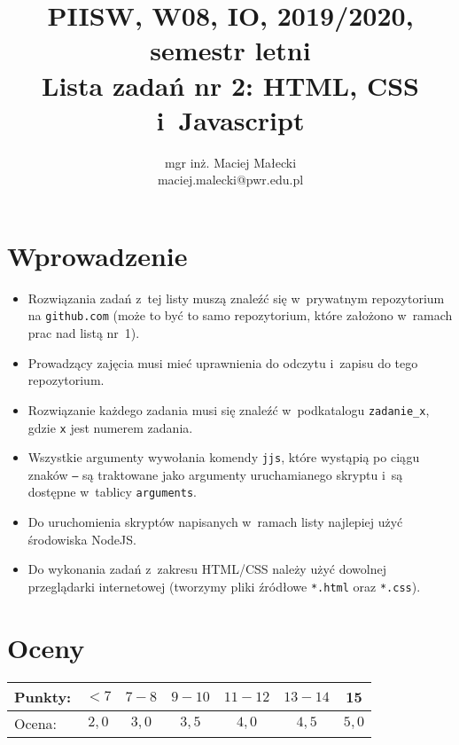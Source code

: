 \documentclass[12pt]{article}
\title{PIISW, W08, IO, 2019/2020, semestr letni\\Lista zadań nr 2: HTML, CSS i~Javascript}
\author{mgr inż. Maciej Małecki\\\small{maciej.malecki@pwr.edu.pl}}
\begin{document}
    \maketitle

    \section*{Wprowadzenie}
    \begin{itemize}
        \item Rozwiązania zadań z~tej listy muszą znaleźć się w~prywatnym repozytorium na \texttt{github.com} (może to być to samo repozytorium, które założono w~ramach prac nad listą nr~1).
        \item Prowadzący zajęcia musi mieć uprawnienia do odczytu i~zapisu do tego repozytorium.
        \item Rozwiązanie każdego zadania musi się znaleźć w~podkatalogu \texttt{zadanie\_x}, gdzie \texttt{x} jest numerem zadania.
        \item Wszystkie argumenty wywołania komendy \texttt{jjs}, które wystąpią po ciągu znaków \texttt{--} są traktowane jako argumenty uruchamianego skryptu i~są dostępne w~tablicy \texttt{arguments}.
		\item Do uruchomienia skryptów napisanych w~ramach listy najlepiej użyć środowiska NodeJS.
        \item Do wykonania zadań z~zakresu HTML/CSS należy użyć dowolnej przeglądarki internetowej (tworzymy pliki źródłowe \texttt{*.html} oraz \texttt{*.css}).
    \end{itemize}

    \section*{Oceny}
    \begin{tabular}{|l|c|c|c|c|c|c|}
        \hline
        Punkty: & $<7$ & $7-8$ & $9-10$ & $11-12$ & $13-14$ & 15\\
        \hline
        Ocena:  & $2,0$ & $3,0$ & $3,5$ & $4,0$ & $4,5$ & $5,0$\\
        \hline
    \end{tabular}
\end{document}
